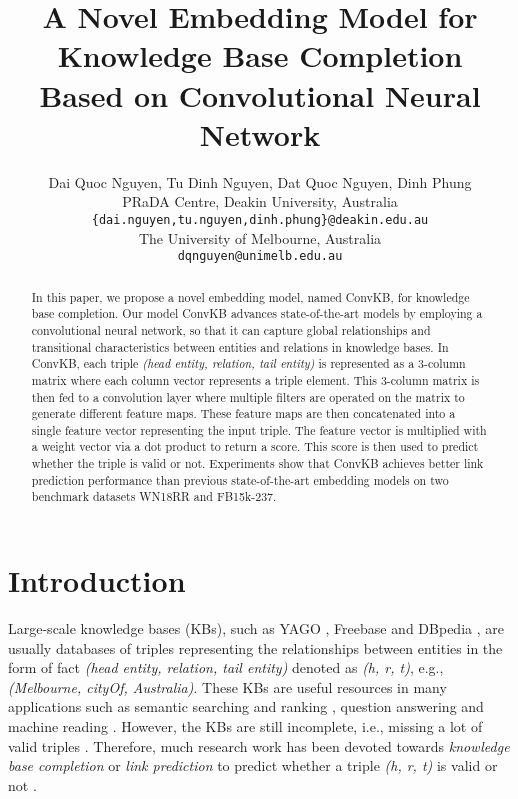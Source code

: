 \documentclass[11pt,a4paper]{article}
\title{A Novel Embedding Model for Knowledge Base Completion \\ Based on Convolutional Neural Network }
\author{
Dai Quoc Nguyen, Tu Dinh Nguyen, Dat Quoc Nguyen, Dinh Phung \\
 PRaDA Centre, Deakin University, Australia \\
{\tt{{\{dai.nguyen,tu.nguyen,dinh.phung\}@deakin.edu.au}}} \\
 The University of Melbourne, Australia \\
 {\tt{{dqnguyen@unimelb.edu.au}}}
}
\begin{document}
\maketitle

\begin{abstract}

In this paper, we propose a novel embedding model, named ConvKB, for  knowledge base completion. Our  model ConvKB advances  state-of-the-art models by employing a convolutional neural network, so that it can capture global relationships and transitional characteristics between entities and relations in  knowledge bases. In ConvKB, each  triple \textit{(head entity, relation, tail entity)} is represented as a 3-column matrix where each column vector represents a triple element. This  3-column matrix is then fed to a convolution layer where multiple filters are operated on the matrix to generate different feature maps. These feature maps are then concatenated into a single feature vector representing the input triple. The feature vector is multiplied with a weight vector via a dot product to return a score. This score is then used to predict whether the triple is valid or not. Experiments show that ConvKB achieves better link prediction performance than previous state-of-the-art embedding models on two benchmark datasets WN18RR and FB15k-237.

\end{abstract}

\section{Introduction}
Large-scale knowledge bases (KBs), such as YAGO \citep{Suchanek:2007}, Freebase \citep{Bollacker:2008} and DBpedia \citep{lehmann2015dbpedia}, are usually databases of triples representing the relationships between entities in the form of fact \textit{(head entity, relation, tail entity)} denoted as \textit{(h, r, t)}, e.g., \textit{(Melbourne, cityOf, Australia)}.    
These KBs are useful resources in many applications such as semantic searching and ranking \citep{kasneci2008naga,Schuhmacher:2014,xiong2017explicit}, question answering \citep{zhang2016question,hao2017end} and machine reading \citep{yang-mitchell:2017}. 
However, the KBs are still incomplete, i.e., missing a lot of valid triples \citep{NIPS2013_5028,West:2014}. 
Therefore, much research work has been devoted towards \textit{knowledge base completion} or \textit{link prediction}  to predict whether a triple \textit{(h, r, t)} is valid or not \citep{bordes2011learning}.
\end{document}
